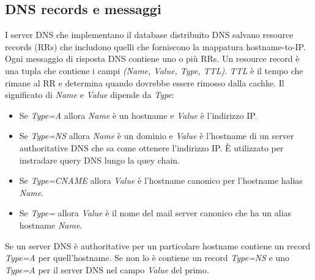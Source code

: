 \subsection{DNS records e messaggi}
I server DNS che implementano il database distribuito DNS salvano resource records (RRs) che includono quelli che forniscono la mappatura hostname-to-IP. Ogni messaggio di risposta DNS contiene
uno o pi\`u RRs. Un resource record \`e una tupla che contiene i campi \emph{(Name, Value, Type, TTL)}. \emph{TTL} \`e il tempo che rimane al RR e determina quando dovrebbe essere rimosso dalla cachke. 
Il significato di \emph{Name} e \emph{Value} dipende da \emph{Type}:
\begin{itemize}
\item Se \emph{Type=A} allora \emph{Name} \`e un hostname e \emph{Value} \`e l'indirizzo IP. 
\item Se \emph{Type=NS} allora \emph{Name} \`e un dominio e \emph{Value} \`e l'hostname di un server authoritative DNS che sa come ottenere l'indirizzo IP.  \`E utilizzato per instradare query DNS lungo
la quey chain.
\item Se \emph{Type=CNAME} allora \emph{Value} \`e l'hostname canonico per l'hostname halias \emph{Name}.
\item Se \emph{Type=} allora \emph{Value} \`e il nome del mail server canonico che ha un alias hostname \emph{Name}. 
\end{itemize}
Se un server DNS \`e authoritative per un particolare hostname contiene un record \emph{Type=A} per quell'hostname. Se non lo \`e contiene un record \emph{Type=NS} e uno \emph{Type=A} per il server 
DNS nel campo \emph{Value} del primo.
